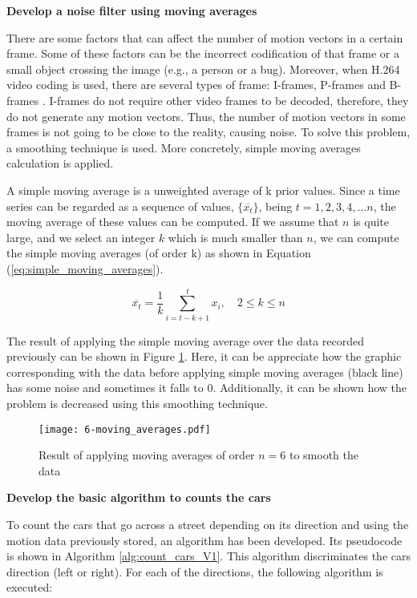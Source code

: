 \textbf{Develop a noise filter using moving averages}

There are some factors that can affect the number of motion vectors in a certain frame. Some of these factors can be the incorrect codification of that frame or a small object crossing the image (e.g., a person or a bug). Moreover, when H.264 video coding is used, there are several types of frame: I-frames, P-frames and B-frames . I-frames do not require other video frames to be decoded, therefore, they do not generate any motion vectors. Thus, the number of motion vectors in some frames is not going to be close to the reality, causing noise. To solve this problem, a smoothing technique is used. More concretely, simple moving averages calculation is applied.

A simple moving average \cite{Smi15} is a unweighted average of k prior values. Since a time series can be regarded as a sequence of values, $\{\overline {x_{t}}\}$, being $t=1,2,3,4,…n$, the moving average of these values can be computed. If we assume that $n$ is quite large, and we select an integer $k$ which is much smaller than $n$, we can compute the simple moving averages (of order k) as shown in Equation (\ref{eq:simple_moving_averages}).

\begin{equation} \label{eq:simple_moving_averages}
\overline { { x }_{ t } } =\frac { 1 }{ k } \sum _{ i=t-k+1 }^{ t }{ { x }_{ i } } ,\quad 2\le k\le n
\end{equation}

The result of applying the simple moving average over the data recorded previously can be shown in Figure \ref{fig:6-moving_averages}. Here, it can be appreciate how the graphic corresponding with the data before applying simple moving averages (black line) has some noise and sometimes it falls to 0. Additionally, it can be shown how the problem is decreased using this smoothing technique.

\begin{figure}[!h]
	\begin{center}
		\texttt{[image: 6-moving\_averages.pdf]}
		\caption{Result of applying moving averages of order $n = 6$ to smooth the data}
		\label{fig:6-moving_averages}
	\end{center}
\end{figure}


\textbf{Develop the basic algorithm to counts the cars}

To count the cars that go across a street depending on its direction and using the motion data previously stored, an algorithm has been developed. Its pseudocode is shown in Algorithm \ref{alg:count_cars_V1}. This algorithm discriminates the cars direction (left or right). For each of the directions, the following algorithm is executed: 

